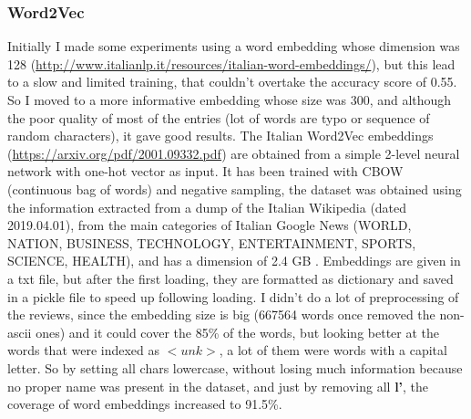 \documentclass{article}
\begin{document}
            \subsubsection{Word2Vec}
            Initially I made some experiments using a word embedding whose dimension was 128 (\url{http://www.italianlp.it/resources/italian-word-embeddings/}),
            but this lead to a slow and limited training, that couldn't overtake the accuracy score of 0.55.
            So I moved to a more informative embedding whose size was 300, and although the poor quality of most of the entries
            (lot of words are typo or sequence of random characters), it gave good results.
            The Italian Word2Vec embeddings (\url{https://arxiv.org/pdf/2001.09332.pdf}) are obtained from a simple 2-level neural network with one-hot vector as input.
            It has been trained with CBOW (continuous bag of words) and negative sampling, the dataset was obtained using the information extracted from a
            dump of the Italian Wikipedia (dated 2019.04.01), from the main categories of Italian Google News (WORLD, NATION, BUSINESS,
            TECHNOLOGY, ENTERTAINMENT, SPORTS, SCIENCE, HEALTH), and has a dimension of 2.4 GB .
            Embeddings are given in a txt file, but after the first loading, they are formatted as dictionary and saved in a pickle file
            to speed up following loading.
            I didn't do a lot of preprocessing of the reviews, since the embedding size is big (667564 words once removed the non-ascii ones)
            and it could cover the 85\% of the words, but looking better at the words that were indexed as $<unk>$, a lot of them were words with a capital letter.
            So by setting all chars lowercase, without losing much information because no proper name was present in the dataset, and just by removing all \textbf{l'},
            the coverage of word embeddings increased to 91.5\%.
\end{document}
